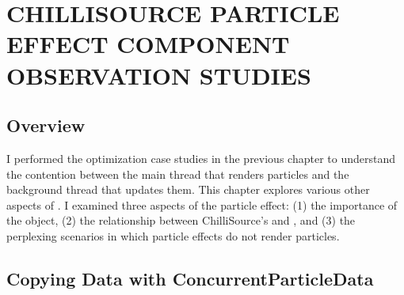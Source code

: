 

\chapter{CHILLISOURCE PARTICLE EFFECT COMPONENT OBSERVATION STUDIES}\label{ch:observations}

\section{Overview}\label{sec:observe_overview}

I performed the optimization case studies in the previous chapter to understand the contention between the main thread that renders particles and the background thread that updates them. This chapter explores various other aspects of . I examined three aspects of the particle effect: (1) the importance of the  object, (2) the relationship between ChilliSource's  and , and (3) the perplexing scenarios in which particle effects do not render particles.

\section{Copying Data with ConcurrentParticleData}\label{sec:observe_copies}

